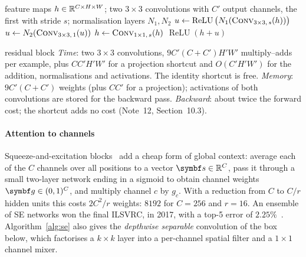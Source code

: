 \documentclass[11pt]{article}
\newcommand{\Hout}{H'}
\newcommand{\Wout}{W'}
\newcommand{\ReLU}{\operatorname{ReLU}}
\begin{document}
\begin{algorithm}[htbp]
\caption{Residual block of a convnet (basic form)}\label{alg:res}
\begin{algorithmic}[1]
\Require feature maps $h \in \mathbb{R}^{C \times H \times W}$; two $3 \times 3$ convolutions with $C'$ output channels, the first
  with stride $s$; normalisation layers $N_1, N_2$
  \State $u \gets \ReLU\big(N_1(\textsc{Conv}_{3\times3,\,s}(h))\big)$ 
  \State $u \gets N_2(\textsc{Conv}_{3\times3,\,1}(u))$
    \State $h \gets \textsc{Conv}_{1\times1,\,s}(h)$ 
  \EndIf
  \State \Return $\ReLU(h + u)$ 
\EndFunction
\end{algorithmic}
\end{algorithm}

\begin{runtime}{residual block}
\emph{Time}: two $3 \times 3$ convolutions, $9C'(C + C')\Hout\Wout$ multiply--adds per example, plus $CC'\Hout\Wout$ for a
projection shortcut and $O(C'\Hout\Wout)$ for the addition, normalisations and activations. The identity shortcut is
free. \emph{Memory}: $9C'(C + C')$ weights (plus $CC'$ for a projection); activations of both convolutions are stored for
the backward pass. \emph{Backward}: about twice the forward cost; the shortcut adds no cost (Note~12, Section~10.3).
\end{runtime}

\paragraph{Attention to channels} Squeeze-and-excitation blocks~\cite{hu2018} add a cheap form of global context: average
each of the $C$ channels over all positions to a vector $\vect{s} \in \R^C$, pass it through a small two-layer network
ending in a sigmoid to obtain channel weights $\vect{g} \in (0, 1)^C$, and multiply channel $c$ by $g_c$. With a
reduction from $C$ to $C/r$ hidden units this costs $2C^2/r$ weights: $8192$ for $C = 256$ and $r = 16$. An ensemble of
SE networks won the final ILSVRC, in 2017, with a top-5 error of $2.25\%$~\cite{hu2018}. Algorithm~\ref{alg:se} also
gives the \emph{depthwise separable} convolution of the box below, which factorises a $k \times k$ layer into a
per-channel spatial filter and a $1 \times 1$ channel mixer.
\end{document}
